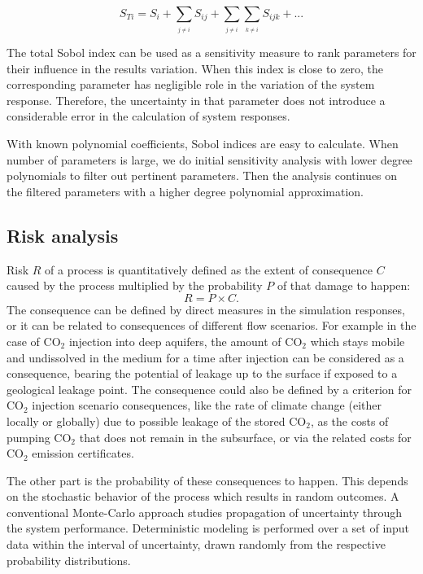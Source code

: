 \begin{equation}
S_{Ti}=S_{i}+\underset{_{j\neq i}}{\sum}S_{ij}+\underset{_{j\neq
i}}{\sum}\underset{_{k\neq i}}{\sum}S_{ijk}+...\label{eq:totSob}\end{equation}


The total Sobol index can be used as a sensitivity measure to rank parameters
for their influence in the results variation. When this index is close to zero,
the corresponding parameter has negligible role in the variation of the system
response. Therefore, the uncertainty in that parameter does not introduce a
considerable error in the calculation of system responses. 

With known polynomial coefficients, Sobol indices are easy to calculate. When
number of parameters is large, we do initial sensitivity analysis with lower
degree polynomials to filter out pertinent parameters. Then the analysis
continues on the filtered parameters with a higher
degree polynomial approximation.

\subsection{Risk analysis}
\label{Section:RA}
Risk $R$ of a process is quantitatively defined as the extent of consequence $C$
caused by the process multiplied by the probability $P$ of that damage to
happen:
%
\begin{equation}
R=P\times C\label{eq:rsk}.\end{equation}
%
The consequence can be defined by direct measures in the simulation responses,
or it can be related to consequences of different flow scenarios. For example in
the case of $\mbox{CO}_{2}$ injection into deep aquifers, the amount of
$\mbox{CO}_{2}$ which stays mobile and undissolved in the medium for a time
after injection can be considered as a consequence, bearing the potential of
leakage up to the surface if exposed to a geological leakage point. The
consequence could also be defined by a criterion for $\mbox{CO}_{2}$ injection
scenario consequences, like the rate of climate change (either locally or
globally) due to possible leakage of the stored $\mbox{CO}_{2}$, as the costs of
pumping $\mbox{CO}_{2}$ that does not remain in the subsurface, or via the
related costs for $\mbox{CO}_{2}$ emission certificates.

The other part is the probability of these consequences to happen. This depends
on the stochastic behavior of the process which results in random outcomes. A
conventional Monte-Carlo approach studies propagation of uncertainty through the
system performance. Deterministic modeling is performed over a set of input data
within the interval of uncertainty, drawn randomly from the respective
probability distributions. 

